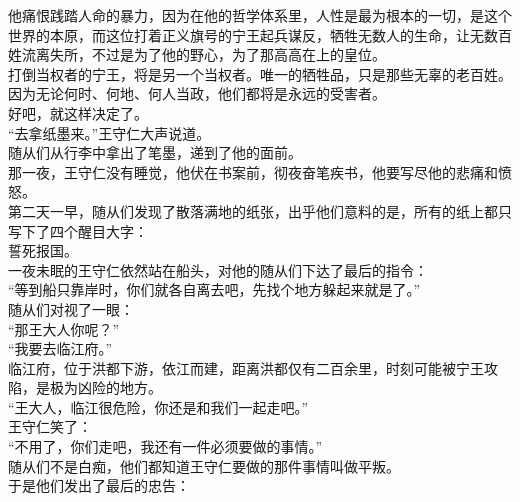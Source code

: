 \begin{multicols}{\theparacolNo}
他痛恨践踏人命的暴力，因为在他的哲学体系里，人性是最为根本的一切，是这个世界的本原，而这位打着正义旗号的宁王起兵谋反，牺牲无数人的生命，让无数百姓流离失所，不过是为了他的野心，为了那高高在上的皇位。\\

打倒当权者的宁王，将是另一个当权者。唯一的牺牲品，只是那些无辜的老百姓。因为无论何时、何地、何人当政，他们都将是永远的受害者。\\

好吧，就这样决定了。\\

“去拿纸墨来。”王守仁大声说道。\\

随从们从行李中拿出了笔墨，递到了他的面前。\\

那一夜，王守仁没有睡觉，他伏在书案前，彻夜奋笔疾书，他要写尽他的悲痛和愤怒。\\

第二天一早，随从们发现了散落满地的纸张，出乎他们意料的是，所有的纸上都只写下了四个醒目大字：\\

誓死报国。\\

一夜未眠的王守仁依然站在船头，对他的随从们下达了最后的指令：\\

“等到船只靠岸时，你们就各自离去吧，先找个地方躲起来就是了。”\\

随从们对视了一眼：\\

“那王大人你呢？”\\

“我要去临江府。”\\

临江府，位于洪都下游，依江而建，距离洪都仅有二百余里，时刻可能被宁王攻陷，是极为凶险的地方。\\

“王大人，临江很危险，你还是和我们一起走吧。”\\

王守仁笑了：\\

“不用了，你们走吧，我还有一件必须要做的事情。”\\

随从们不是白痴，他们都知道王守仁要做的那件事情叫做平叛。\\

于是他们发出了最后的忠告：\\


\end{multicols}
